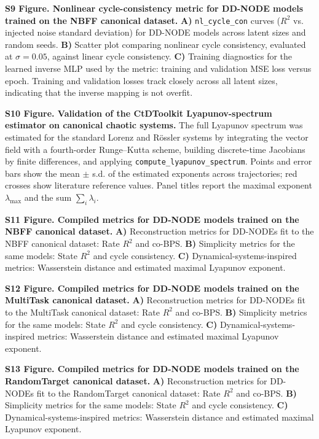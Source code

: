 \documentclass{article}
\begin{document}
\noindent\textbf{S9 Figure. Nonlinear cycle-consistency metric for DD-NODE models trained on the NBFF canonical dataset.}
\textbf{A)} \texttt{nl\_cycle\_con} curves ($R^2$ vs. injected noise standard deviation) for DD-NODE models across latent sizes and random seeds. \textbf{B)} Scatter plot comparing nonlinear cycle consistency, evaluated at $\sigma = 0.05$, against linear cycle consistency. \textbf{C)} Training diagnostics for the learned inverse MLP used by the metric: training and validation MSE loss versus epoch. Training and validation losses track closely across all latent sizes, indicating that the inverse mapping is not overfit.

\noindent\textbf{S10 Figure. Validation of the CtDToolkit Lyapunov-spectrum estimator on canonical chaotic systems.}
The full Lyapunov spectrum was estimated for the standard Lorenz and R\"ossler systems by integrating the vector field with a fourth-order Runge--Kutta scheme, building discrete-time Jacobians by finite differences, and applying \texttt{compute\_lyapunov\_spectrum}. Points and error bars show the mean $\pm$ s.d. of the estimated exponents across trajectories; red crosses show literature reference values. Panel titles report the maximal exponent $\lambda_{\max}$ and the sum $\sum_i \lambda_i$.

\noindent\textbf{S11 Figure. Compiled metrics for DD-NODE models trained on the NBFF canonical dataset.}
\textbf{A)} Reconstruction metrics for DD-NODEs fit to the NBFF canonical dataset: Rate $R^2$ and co-BPS. \textbf{B)} Simplicity metrics for the same models: State $R^2$ and cycle consistency. \textbf{C)} Dynamical-systems-inspired metrics: Wasserstein distance and estimated maximal Lyapunov exponent.

\noindent\textbf{S12 Figure. Compiled metrics for DD-NODE models trained on the MultiTask canonical dataset.}
\textbf{A)} Reconstruction metrics for DD-NODEs fit to the MultiTask canonical dataset: Rate $R^2$ and co-BPS. \textbf{B)} Simplicity metrics for the same models: State $R^2$ and cycle consistency. \textbf{C)} Dynamical-systems-inspired metrics: Wasserstein distance and estimated maximal Lyapunov exponent.

\noindent\textbf{S13 Figure. Compiled metrics for DD-NODE models trained on the RandomTarget canonical dataset.}
\textbf{A)} Reconstruction metrics for DD-NODEs fit to the RandomTarget canonical dataset: Rate $R^2$ and co-BPS. \textbf{B)} Simplicity metrics for the same models: State $R^2$ and cycle consistency. \textbf{C)} Dynamical-systems-inspired metrics: Wasserstein distance and estimated maximal Lyapunov exponent.
\end{document}
